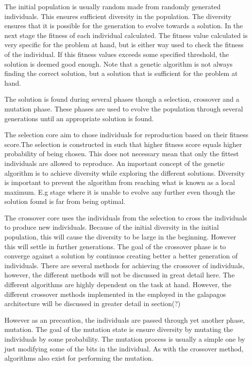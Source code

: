 The initial population is usually random made from randomly generated individuals. This ensures sufficient diversity in the population. The diversity ensures that it is possible for the generation to evolve towards a solution. In the next stage the fitness of each individual calculated. The fitness value calculated is very specific for the problem at hand, but is either way used to check the fitness of the individual. If this fitness values exceeds some specified threshold, the solution is deemed good enough. Note that a genetic algorithm is not always finding the correct solution, but a solution that is sufficient for the problem at hand.

The solution is found during several phases though a selection, crossover and a mutation phase. 
These phases are used to evolve the population through several generations until an appropriate 
solution is found. 

The selection core aim to chose individuals for reproduction based on their fitness score.The selection is constructed in such that higher fitness score equals higher probability of being chosen. This does not necessary mean that only the fittest individuals are allowed to reproduce. An important concept of the genetic algorithm is to achieve diversity while exploring the different solutions. Diversity is important to prevent the algorithm from reaching what is known as a local maximum. E.g stage where it is unable to evolve any further even though the solution found is far from being optimal.

The crossover core uses the individuals from the selection to cross the individuals to produce new individuals. Because of the initial diversity in the initial population, this will cause the diversity to be large in the beginning. However this will settle in further generations. The goal of the crossover phase is to converge against a solution by continuos creating better a better generation of individuals. There are several methods for achieving the crossover of individuals, however, the different methods will not be discussed in great detail here. The different algorithms are highly dependent on the task at hand. However, the different crossover methods implemented in the employed in the galapagos architecture will be discussed in greater detail in section(?) 

However as an precaution, the individuals are passed through yet another phase, mutation. The goal of the mutation state is ensure diversity by mutating the individuals by some probability. The mutation process is usually a simple one by just modifying some of the bits in the individual. As with the crossover method, algorithms also exist for performing the mutation. 

